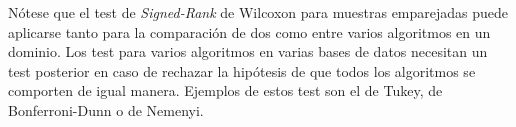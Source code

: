	Nótese que el test de \textit{Signed-Rank} de Wilcoxon para muestras emparejadas puede aplicarse tanto para la comparación de dos como entre varios algoritmos en un dominio. Los test para varios algoritmos en varias bases de datos necesitan un test posterior en caso de rechazar la hipótesis de que todos los algoritmos se comporten de igual manera. Ejemplos de estos test son el de Tukey, de Bonferroni-Dunn o de Nemenyi. 
	
	
	
	
	
	
	
	
%
